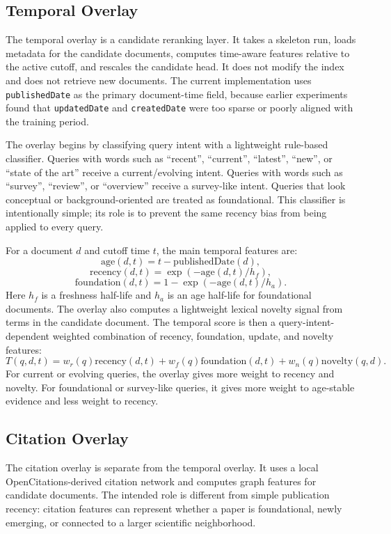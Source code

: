 \documentclass[11pt]{article}
\begin{document}
\subsection{Temporal Overlay}
\label{sec:temporal-overlay}

The temporal overlay is a candidate reranking layer. It takes a skeleton run, loads metadata for the candidate documents, computes time-aware features relative to the active cutoff, and rescales the candidate head. It does not modify the index and does not retrieve new documents. The current implementation uses \texttt{publishedDate} as the primary document-time field, because earlier experiments found that \texttt{updatedDate} and \texttt{createdDate} were too sparse or poorly aligned with the training period.

The overlay begins by classifying query intent with a lightweight rule-based classifier. Queries with words such as ``recent'', ``current'', ``latest'', ``new'', or ``state of the art'' receive a current/evolving intent. Queries with words such as ``survey'', ``review'', or ``overview'' receive a survey-like intent. Queries that look conceptual or background-oriented are treated as foundational. This classifier is intentionally simple; its role is to prevent the same recency bias from being applied to every query.

For a document $d$ and cutoff time $t$, the main temporal features are:
\[
\mathrm{age}(d,t) = t - \mathrm{publishedDate}(d),
\]
\[
\mathrm{recency}(d,t) = \exp(-\mathrm{age}(d,t)/h_f),
\]
\[
\mathrm{foundation}(d,t) = 1 - \exp(-\mathrm{age}(d,t)/h_a).
\]
Here $h_f$ is a freshness half-life and $h_a$ is an age half-life for foundational documents. The overlay also computes a lightweight lexical novelty signal from terms in the candidate document. The temporal score is then a query-intent-dependent weighted combination of recency, foundation, update, and novelty features:
\[
T(q,d,t) = w_r(q)\mathrm{recency}(d,t) + w_f(q)\mathrm{foundation}(d,t) + w_n(q)\mathrm{novelty}(q,d).
\]
For current or evolving queries, the overlay gives more weight to recency and novelty. For foundational or survey-like queries, it gives more weight to age-stable evidence and less weight to recency.

\subsection{Citation Overlay}
\label{sec:citation-overlay}

The citation overlay is separate from the temporal overlay. It uses a local OpenCitations-derived citation network and computes graph features for candidate documents. The intended role is different from simple publication recency: citation features can represent whether a paper is foundational, newly emerging, or connected to a larger scientific neighborhood.
\end{document}
